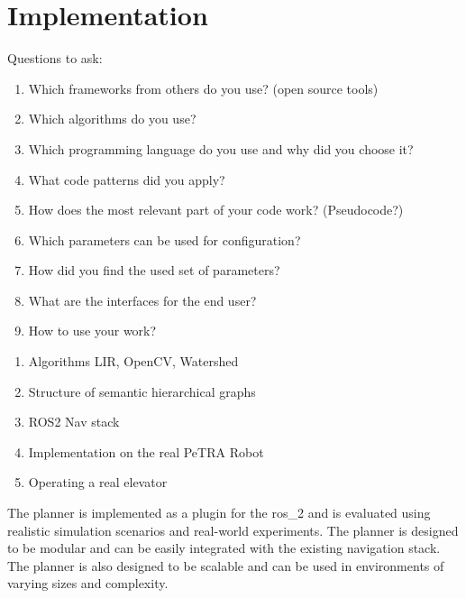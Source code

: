 \chapter{Implementation}
\label{sec:implementation}
Questions to ask:
\begin{enumerate}
    \item Which frameworks from others do you use? (open source tools)
    \item Which algorithms do you use?
    \item Which programming language do you use and why did you choose it?
    \item What code patterns did you apply?
    \item How does the most relevant part of your code work? (Pseudocode?)
    \item Which parameters can be used for configuration?
    \item How did you find the used set of parameters?   
    \item What are the interfaces for the end user?
    \item How to use your work?
\end{enumerate}

\begin{enumerate}
    \item Algorithms LIR, OpenCV, Watershed
    \item Structure of semantic hierarchical graphs
    \item ROS2 Nav stack
    \item Implementation on the real PeTRA Robot
    \item Operating a real elevator 
\end{enumerate}

The planner is implemented as a plugin for the \gls{ros_2} and is evaluated using realistic simulation scenarios and real-world experiments. The planner is designed to be modular and can be easily integrated with the existing navigation stack. The planner is also designed to be scalable and can be used in environments of varying sizes and complexity.
